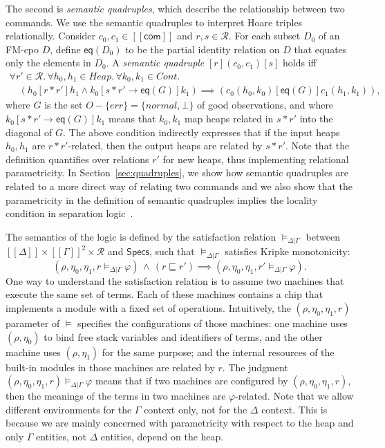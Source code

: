 \documentclass{LMCS}
\newcommand{\com}{\mathsf{com}}
\newcommand{\Spec}{\mathsf{Specs}}
\newcommand{\Heap}{\mathit{Heap}}
\newcommand{\Obs}{\mathit{O}}
\newcommand{\Good}{\mathit{G}}
\newcommand{\cR}{\mathcal{R}}
\newcommand{\cont}{\mathit{Cont}}
\newcommand{\normal}{\mathit{normal}}
\newcommand{\error}{\mathit{err}}
\newcommand{\ff}[1]{[\![#1]\!]}
\newcommand{\squad}[4]{{[{#1}]}
                        ({#2},  {#3})
                       {[{#4}]}}
\newcommand{\EQ}{\mathsf{eq}}
\begin{document}
The second is {\em semantic quadruples}, which describe
the relationship between two commands. We use
the semantic quadruples to interpret Hoare triples relationally.
Consider $c_0,c_1 \in \ff{\com}$
and $r,s \in \cR$. 
For each subset $D_0$ of an FM-cpo $D$,
define $\EQ(D_0)$ to be the partial identity relation on $D$ that 
equates only the elements in $D_0$. A {\em semantic quadruple\/} 
$\squad{r}{c_0}{c_1}{s}$ holds iff
$$
\begin{array}{l}
  \forall r' \in \cR.\,
  \forall h_0,h_1 \in \Heap.\,
  \forall k_0,k_1 \in \cont.\, 
\\
  \quad (h_0[r*r']h_1 \wedge k_0[s*r' \rightarrow \EQ(\Good)]k_1)
        \implies
        (c_0(h_0,k_0)[\EQ(\Good)]c_1(h_1,k_1)),
\end{array}
$$
where $\Good$ is the set $\Obs -\{\error\} = \{\normal,\bot\}$ of good
observations, and where $k_0[s*r' \rightarrow \EQ(\Good)]k_1$ means
that $k_0, k_1$ map heaps related in $s*r'$ into the diagonal of $\Good$.
The above condition 
indirectly expresses that if the input heaps $h_0,h_1$ are 
$r*r'$-related, then the output 
heaps are related by $s*r'$. Note that the definition 
quantifies over relations $r'$ for new heaps, thus implementing
relational parametricity.  In Section~\ref{sec:quadruples},
we show how semantic quadruples are related to a more
direct way of relating two commands and we also show
that the parametricity in the definition of semantic quadruples
implies the locality condition in separation logic~\cite{reynolds02}.

The semantics of the logic is defined by the satisfaction relation 
$\models_{\Delta|\Gamma}$ between
$\ff{\Delta} \times \ff{\Gamma}^2\times\cR$
and $\Spec$,
such that $\models_{\Delta|\Gamma}$ satisfies Kripke monotonicity:
$$
    (\rho,\eta_0,\eta_1, r \models_{\Delta|\Gamma} \varphi)  \,\wedge\, 
    (r \sqsubseteq r')
    \implies 
    (\rho,\eta_0,\eta_1, r' \models_{\Delta|\Gamma} \varphi).
$$ 
One way to understand the satisfaction relation is to
assume two machines that execute the same set of terms.
Each of these machines contains a chip that implements 
a module with a fixed set of operations. 
Intuitively, the
$(\rho,\eta_0,\eta_1,r)$ parameter of $\models$
specifies the configurations of those machines:
one machine uses $(\rho,\eta_0)$ to bind free stack variables
and identifiers of terms, and the other machine uses $(\rho,\eta_1)$
for the same purpose; and the internal resources of the
built-in modules
in those machines are related by $r$. The judgment $(\rho,\eta_0,\eta_1,r) \models_{\Delta|\Gamma} \varphi$
means that if two machines are configured by $(\rho,\eta_0,\eta_1,r)$,
then the meanings of the terms in two machines
are $\varphi$-related. Note that 
we allow different environments for the $\Gamma$ context only,
not for the $\Delta$ context. This is because we are mainly
concerned with parametricity with respect to the heap
and only $\Gamma$ entities, not $\Delta$ entities, 
depend on the heap. 
\end{document}
